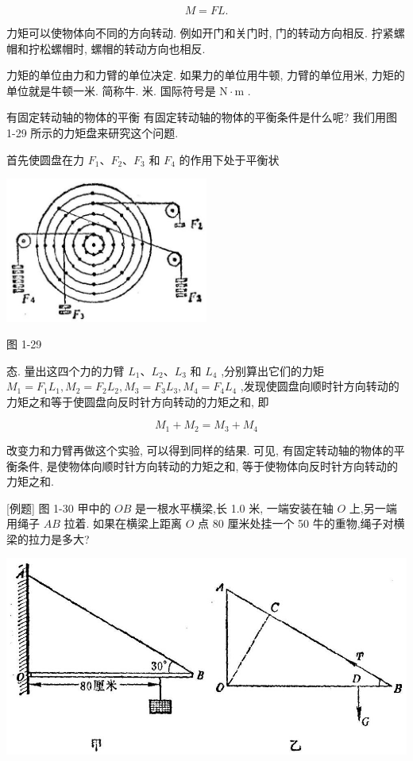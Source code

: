 \documentclass[10pt]{article}
\begin{document}
\[
M = {FL}\text{.}
\]

力矩可以使物体向不同的方向转动. 例如开门和关门时, 门的转动方向相反. 拧紧螺帽和拧松螺帽时, 螺帽的转动方向也相反.

力矩的单位由力和力臂的单位决定. 如果力的单位用牛顿, 力臂的单位用米, 力矩的单位就是牛顿一米. 简称牛. 米. 国际符号是 \(\mathrm{N} \cdot \mathrm{m}\) .

有固定转动轴的物体的平衡 有固定转动轴的物体的平衡条件是什么呢? 我们用图 1-29 所示的力矩盘来研究这个问题.

首先使圆盘在力 \({F}_{1}\text{、}{F}_{2}\text{、}{F}_{3}\) 和 \({F}_{4}\) 的作用下处于平衡状

\begin{center}
\includegraphics[max width=0.5\textwidth]{images/01912d55-147c-70aa-b0e0-1782a122f948_42_728486.jpg}
\end{center}

图 1-29

态. 量出这四个力的力臂 \({L}_{1}\text{、}{L}_{2}\text{、}{L}_{3}\) 和 \({L}_{4}\) ,分别算出它们的力矩 \({M}_{1} = {F}_{1}{L}_{1},{M}_{2} = {F}_{2}{L}_{2},{M}_{3} = {F}_{3}{L}_{3},{M}_{4} = {F}_{4}{L}_{4}\) ,发现使圆盘向顺时针方向转动的力矩之和等于使圆盘向反时针方向转动的力矩之和, 即

\[
{M}_{1} + {M}_{2} = {M}_{3} + {M}_{4}
\]

改变力和力臂再做这个实验, 可以得到同样的结果. 可见, 有固定转动轴的物体的平衡条件, 是使物体向顺时针方向转动的力矩之和, 等于使物体向反时针方向转动的力矩之和.

[例题] 图 1-30 甲中的 \({OB}\) 是一根水平横梁,长 1.0 米, 一端安装在轴 \(O\) 上,另一端用绳子 \({AB}\) 拉着. 如果在横梁上距离 \(O\) 点 80 厘米处挂一个 50 牛的重物,绳子对横梁的拉力是多大?

\begin{center}
\includegraphics[max width=1.0\textwidth]{images/01912d55-147c-70aa-b0e0-1782a122f948_42_933056.jpg}
\end{center}
\end{document}
